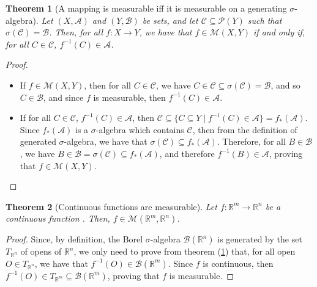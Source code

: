\documentclass{article}
\newtheorem{theorem}{Theorem}[section]
\theoremstyle{definition}
\theoremstyle{remark}
\theoremstyle{example}
\theoremstyle{notation}
\begin{document}
\begin{theorem}[A mapping is measurable iff it is measurable on a generating $\sigma$-algebra] \label{thm:measurable-iff-measurable-on-generating-sigma-algebra}%
		Let $(X, \mathcal{A})$ and $(Y, \mathcal{B})$ be sets, and let $\mathcal{C} \subseteq \mathcal{P}(Y)$ such that $\sigma(\mathcal{C}) = \mathcal{B}$. Then, for all $f : X \rightarrow Y$, we have that $f \in \mathcal{M}(X, Y)$ if and only if, for all $C \in \mathcal{C}$, $f^{-1}(C) \in \mathcal{A}$.
\end{theorem}

\begin{proof}~
		\begin{itemize}
				\item If $f \in \mathcal{M}(X, Y)$, then for all $C \in \mathcal{C}$, we have $C \in \mathcal{C} \subseteq \sigma(\mathcal{C}) = \mathcal{B}$, and so $C \in \mathcal{B}$, and since $f$ is measurable, then $f^{-1}(C) \in \mathcal{A}$.
				\item If for all $C \in \mathcal{C}$, $f^{-1}(C) \in \mathcal{A}$, then $\mathcal{C} \subseteq \{C \subseteq Y \mid f^{-1}(C) \in \mathcal{A}\} = f_*(\mathcal{A})$. Since $f_*(\mathcal{A})$ is a $\sigma$-algebra which contains $\mathcal{C}$, then from the definition of generated $\sigma$-algebra, we have that $\sigma(\mathcal{C}) \subseteq f_*(\mathcal{A})$. Therefore, for all $B \in \mathcal{B}$, we have $B \in \mathcal{B} = \sigma(\mathcal{C}) \subseteq f_*(\mathcal{A})$, and therefore $f^{-1}(B) \in \mathcal{A}$, proving that $f \in \mathcal{M}(X, Y)$.
		\end{itemize}
\end{proof}

\begin{theorem}[Continuous functions are measurable] \label{thm:continuous-measurable} %
		Let $f : \mathbb{R}^m \rightarrow \mathbb{R}^n$ be a continuous function . Then, $f \in \mathcal{M}(\mathbb{R}^m, \mathbb{R}^n)$.
\end{theorem}

\begin{proof}
		Since, by definition, the Borel $\sigma$-algebra $\mathcal{B}(\mathbb{R}^n)$ is generated by the set $T_{\mathbb{R}^n}$ of opens of $\mathbb{R}^n$, we only need to prove from theorem (\ref{thm:measurable-iff-measurable-on-generating-sigma-algebra}) that, for all open $O \in T_{\mathbb{R}^n}$, we have that $f^{-1}(O) \in \mathcal{B}(\mathbb{R}^m)$. Since $f$ is continuous, then $f^{-1}(O) \in T_{\mathbb{R}^m} \subseteq \mathcal{B}(\mathbb{R}^m)$, proving that $f$ is measurable.
\end{proof}
\end{document}
